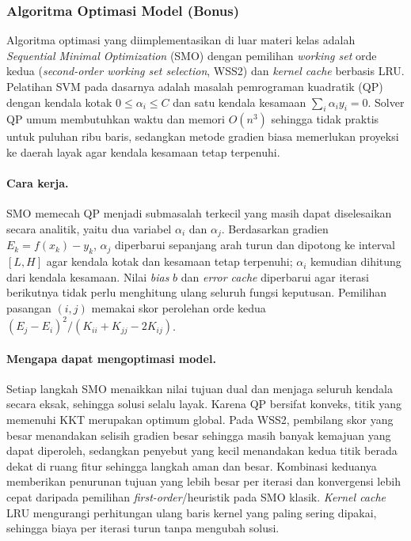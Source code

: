 \subsubsection{Algoritma Optimasi Model (Bonus)}

Algoritma optimasi yang diimplementasikan di luar materi kelas adalah
\textit{Sequential Minimal Optimization} (SMO) dengan pemilihan
\textit{working set} orde kedua (\textit{second-order working set selection},
WSS2) dan \textit{kernel cache} berbasis LRU. Pelatihan SVM pada dasarnya
adalah masalah pemrograman kuadratik (QP) dengan kendala kotak
$0 \le \alpha_i \le C$ dan satu kendala kesamaan $\sum_i \alpha_i y_i = 0$.
Solver QP umum membutuhkan waktu dan memori $O(n^3)$ sehingga tidak praktis
untuk puluhan ribu baris, sedangkan metode gradien biasa memerlukan proyeksi
ke daerah layak agar kendala kesamaan tetap terpenuhi.

\paragraph{Cara kerja.}
SMO memecah QP menjadi submasalah terkecil yang masih dapat diselesaikan
secara analitik, yaitu dua variabel $\alpha_i$ dan $\alpha_j$. Berdasarkan
gradien $E_k = f(x_k) - y_k$, $\alpha_j$ diperbarui sepanjang arah turun dan
dipotong ke interval $[L,H]$ agar kendala kotak dan kesamaan tetap terpenuhi;
$\alpha_i$ kemudian dihitung dari kendala kesamaan. Nilai \textit{bias} $b$
dan \textit{error cache} diperbarui agar iterasi berikutnya tidak perlu
menghitung ulang seluruh fungsi keputusan. Pemilihan pasangan $(i,j)$ memakai
skor perolehan orde kedua
$(E_j - E_i)^2/(K_{ii} + K_{jj} - 2K_{ij})$.

\paragraph{Mengapa dapat mengoptimasi model.}
Setiap langkah SMO menaikkan nilai tujuan dual dan menjaga seluruh kendala
secara eksak, sehingga solusi selalu layak. Karena QP bersifat konveks, titik
yang memenuhi KKT merupakan optimum global. Pada WSS2, pembilang skor yang
besar menandakan selisih gradien besar sehingga masih banyak kemajuan yang
dapat diperoleh, sedangkan penyebut yang kecil menandakan kedua titik berada
dekat di ruang fitur sehingga langkah aman dan besar. Kombinasi keduanya
memberikan penurunan tujuan yang lebih besar per iterasi dan konvergensi lebih
cepat daripada pemilihan \textit{first-order}/heuristik pada SMO klasik.
\textit{Kernel cache} LRU mengurangi perhitungan ulang baris kernel yang
paling sering dipakai, sehingga biaya per iterasi turun tanpa mengubah solusi.

